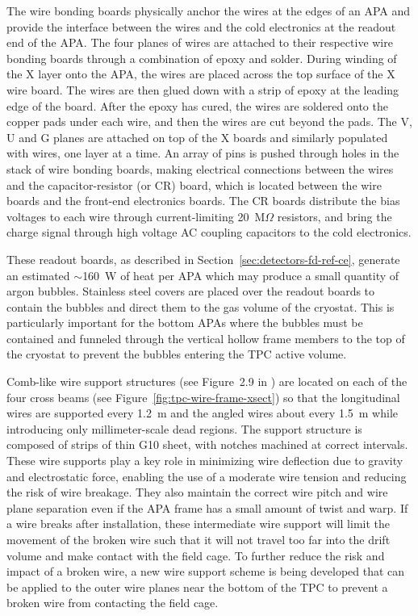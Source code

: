 The wire bonding boards physically anchor the wires at the edges of an
APA and provide the interface between the wires and the cold
electronics at the readout end of the APA.  The four planes of wires
are attached to their respective wire bonding boards through a
combination of epoxy and solder. During winding of the X layer onto
the APA, the wires are placed across the top surface of the X wire
board. The wires are then glued down with a strip of epoxy at the
leading edge of the board.  After the epoxy has cured, the wires are
soldered onto the copper pads under each wire, and then the wires are
cut beyond the pads. The V, U and G planes are attached on top of the
X boards and similarly populated with wires, one layer at a time. An
array of pins is pushed through holes in the stack of wire bonding
boards, making electrical connections between the wires and the
capacitor-resistor (or CR) board, which is located between the wire
boards and the front-end electronics boards.  The CR boards distribute
the bias voltages to each wire through current-limiting 20~M$\Omega$
resistors, and bring the charge signal through high voltage AC
coupling capacitors to the cold electronics.

These readout boards, as described in
Section~\ref{sec:detectors-fd-ref-ce}, generate an estimated
$\sim$160~W of heat per APA which may produce a small quantity of
argon bubbles.  Stainless steel covers are placed over the readout
boards to contain the bubbles and direct them to the gas volume of the
cryostat. This is particularly important for the bottom APAs where the
bubbles must be contained and funneled through the vertical hollow
frame members to the top of the cryostat to prevent the bubbles
entering the TPC active volume.

Comb-like wire support structures (see Figure~2.9 in \anxlbnefd) are
located on each of the four cross beams (see Figure~\ref{fig:tpc-wire-frame-xsect})
 so that the longitudinal wires
are supported every 1.2~m and the angled wires about every 1.5~m while
introducing only millimeter-scale dead regions. The support structure
is composed of strips of thin G10 sheet, with notches machined at
correct intervals.  These wire supports play a key role in minimizing
wire deflection due to gravity and electrostatic force, enabling the
use of a moderate wire tension and reducing the risk of wire breakage.
They also maintain the correct wire pitch and wire plane separation
even if the APA frame has a small amount of twist and warp.  If a wire
breaks after installation, these intermediate wire support will limit
the movement of the broken wire such that it will not travel too far
into the drift volume and make contact with the field cage.  To
further reduce the risk and impact of a broken wire, a new wire
support scheme is being developed that can be applied to the outer
wire planes near the bottom of the TPC to prevent a broken wire from
contacting the field cage.


